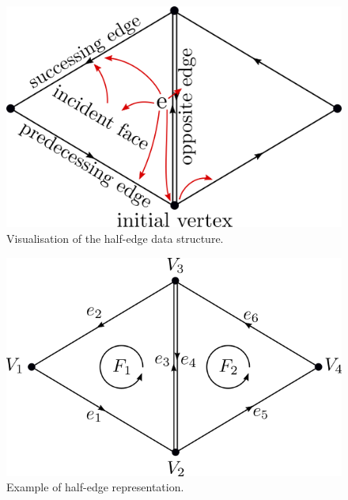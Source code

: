 \begin{figure}
    \centerline{\includegraphics[scale=0.5]{images/img32}}
    \caption[Visualisation of the half-edge data structure]
    {Visualisation of the half-edge data structure.}
    \label{img:32}
\end{figure}

\begin{figure}
    \centerline{\includegraphics[scale=0.5]{images/img31}}
    \caption[Example of half-edge representation]
    {Example of half-edge representation.}
    \label{img:31}
\end{figure}

